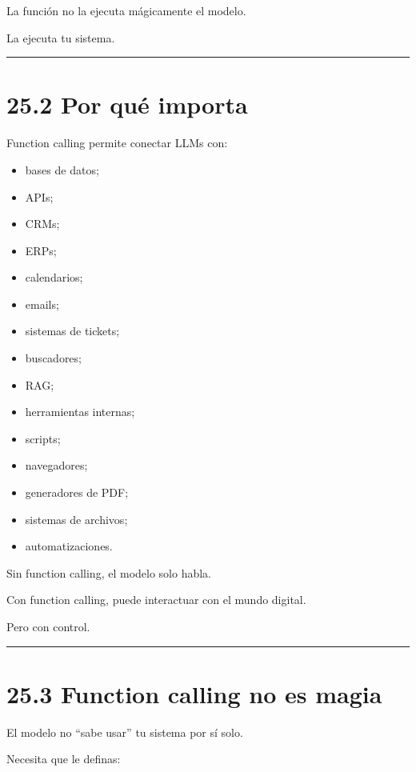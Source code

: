 La función no la ejecuta mágicamente el modelo.

La ejecuta tu sistema.

\begin{center}\rule{0.5\linewidth}{0.5pt}\end{center}

\section{25.2 Por qué importa}\label{por-quuxe9-importa}

Function calling permite conectar LLMs con:

\begin{itemize}
\tightlist
\item
  bases de datos;
\item
  APIs;
\item
  CRMs;
\item
  ERPs;
\item
  calendarios;
\item
  emails;
\item
  sistemas de tickets;
\item
  buscadores;
\item
  RAG;
\item
  herramientas internas;
\item
  scripts;
\item
  navegadores;
\item
  generadores de PDF;
\item
  sistemas de archivos;
\item
  automatizaciones.
\end{itemize}

Sin function calling, el modelo solo habla.

Con function calling, puede interactuar con el mundo digital.

Pero con control.

\begin{center}\rule{0.5\linewidth}{0.5pt}\end{center}

\section{25.3 Function calling no es
magia}\label{function-calling-no-es-magia}

El modelo no ``sabe usar'' tu sistema por sí solo.

Necesita que le definas:

